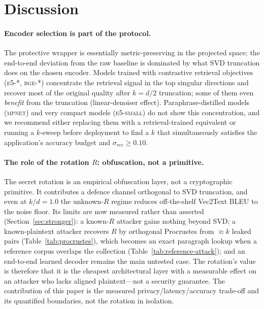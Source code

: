 \documentclass[11pt,a4paper]{article}
\begin{document}
\section{Discussion}\label{sec:discussion}

\paragraph{Encoder selection is part of the protocol.} The protective
wrapper is essentially metric-preserving in the projected space; the
end-to-end deviation from the raw baseline is dominated by what
SVD truncation does on the chosen encoder. Models trained with
contrastive retrieval objectives (\textsc{e5-*}, \textsc{bge-*})
concentrate the retrieval signal in the top singular directions and
recover most of the original quality after $k = d/2$ truncation; some of
them even \emph{benefit} from the truncation (linear-denoiser effect).
Paraphrase-distilled models (\textsc{mpnet}) and very compact models
(\textsc{e5-small}) do not show this concentration, and we recommend
either replacing them with a retrieval-trained equivalent or running a
$k$-sweep before deployment to find a $k$ that simultaneously satisfies
the application's accuracy budget and $\sigma_{rec} \geq 0.10$.

\paragraph{The role of the rotation $R$: obfuscation, not a primitive.}
The secret rotation is an empirical obfuscation layer, not a
cryptographic primitive. It contributes a defence channel orthogonal to
SVD truncation, and even at $k/d = 1.0$ the unknown-$R$ regime reduces
off-the-shelf Vec2Text BLEU to the noise floor. Its limits are now
measured rather than asserted (Section~\ref{sec:stronger}): a known-$R$
attacker gains nothing beyond SVD; a known-plaintext attacker recovers
$R$ by orthogonal Procrustes from $\approx k$ leaked pairs
(Table~\ref{tab:procrustes}), which becomes an exact paragraph lookup
when a reference corpus overlaps the collection
(Table~\ref{tab:reference-attack}); and an end-to-end learned decoder
remains the main untested case. The rotation's value is therefore that
it is the cheapest architectural layer with a measurable effect on an
attacker who lacks aligned plaintext---not a security guarantee. The
contribution of this paper is the measured privacy/latency/accuracy
trade-off and its quantified boundaries, not the rotation in isolation.
\end{document}

